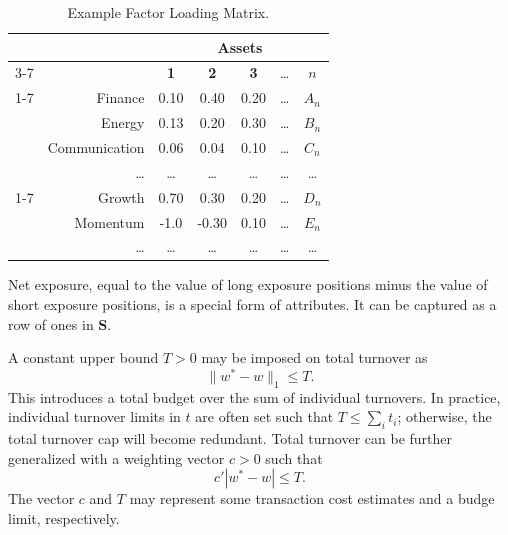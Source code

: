 \documentclass[11pt, letterpaper]{article}
\begin{document}
\begin{table}[t]
\label{example_attribute_matrix}
\centering
    \caption{Example Factor Loading Matrix.}
    \vspace{0.3cm}
    \begin{tabular}{cr *{5}{c}}
        \toprule
        & & \multicolumn{5}{c}{\textbf{Assets}} \\
        \cmidrule(lr){3-7}
        & & \textbf{1} & \textbf{2} & \textbf{3} & \dots & \textbf{$n$} \\
        \cmidrule(lr){1-7}
        & Finance & 0.10 & 0.40 & 0.20 & \dots & $A_n$ \\
        & Energy & 0.13 & 0.20 & 0.30 & \dots & $B_n$ \\
        & Communication & 0.06 & 0.04 & 0.10 & \dots & $C_n$ \\
        & \dots & \dots & \dots & \dots & \dots & \dots \\
        \cmidrule(lr){1-7}
        & Growth & 0.70 & 0.30 & 0.20 & \dots & $D_n$ \\
        & Momentum & -1.0 & -0.30 & 0.10 & \dots & $E_n$ \\
        & \dots & \dots & \dots & \dots & \dots & \dots \\
        \bottomrule
    \end{tabular}
\end{table}

Net exposure, equal to the value of long exposure positions minus the value of short exposure positions, is a special form of
attributes. It can be captured as a row of ones in $\mathbf{S}$.

A constant upper bound $T > 0$ may be imposed on total turnover as
\begin{equation}
    \label{unedited_total_turnover}
	\lVert w^* - w\rVert_1 \leq T.
\end{equation}
This introduces a total budget over the sum of individual turnovers. In practice, individual turnover limits in $t$ are often
set such that $T \leq \sum_i t_i$; otherwise, the total turnover cap will become redundant. Total turnover can be further generalized
with a weighting vector $c > 0$ such that
\begin{equation*}
	c' |w^* - w| \leq T.
\end{equation*}
The vector $c$ and $T$ may represent some transaction cost estimates and a budge limit, respectively.
\end{document}
